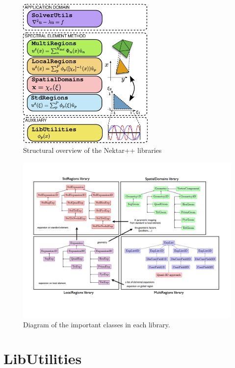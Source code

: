 \begin{figure}
\centering
\includegraphics[width=0.6\textwidth]{library-design/img/architecture}
\caption{Structural overview of the Nektar++ libraries}
\label{f:library:structure}
\end{figure}

\begin{figure}
\centering
\includegraphics[width=\textwidth]{img/overview.png}
\caption{Diagram of the important classes in each library.}
\label{f:library:overview}
\end{figure}

\section{LibUtilities}

